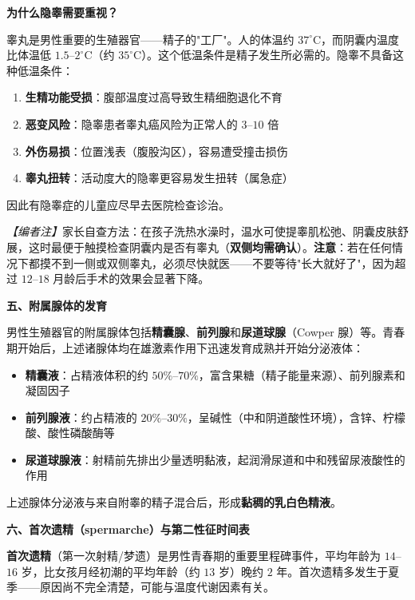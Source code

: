 \vspace{0.3em}
\noindent\textbf{为什么隐睾需要重视？}

睾丸是男性重要的生殖器官——精子的"工厂"。人的体温约 $37^\circ\text{C}$，而阴囊内温度比体温低 $1.5$--$2^\circ\text{C}$（约 $35^\circ\text{C}$）。这个低温条件是精子发生所必需的。隐睾不具备这种低温条件：
\begin{enumerate}
	\item \textbf{生精功能受损}：腹部温度过高导致生精细胞退化不育
	\item \textbf{恶变风险}：隐睾患者睾丸癌风险为正常人的 $3$--$10$ 倍
	\item \textbf{外伤易损}：位置浅表（腹股沟区），容易遭受撞击损伤
	\item \textbf{睾丸扭转}：活动度大的隐睾更容易发生扭转（属急症）
\end{enumerate}

因此有隐睾症的儿童应尽早去医院检查诊治。

\vspace{0.3em}
\noindent\textit{【编者注】}家长自查方法：在孩子洗热水澡时，温水可使提睾肌松弛、阴囊皮肤舒展，这时最便于触摸检查阴囊内是否有睾丸（\textbf{双侧均需确认}）。\textbf{注意}：若在任何情况下都摸不到一侧或双侧睾丸，必须尽快就医——不要等待"长大就好了"，因为超过 $12$--$18$ 月龄后手术的效果会显著下降。


\vspace{0.3em}
\noindent\textbf{五、附属腺体的发育}

男性生殖器官的附属腺体包括\textbf{精囊腺}、\textbf{前列腺}和\textbf{尿道球腺}（Cowper 腺）等。青春期开始后，上述诸腺体均在雄激素作用下迅速发育成熟并开始分泌液体：
\begin{itemize}
	\item \textbf{精囊液}：占精液体积的约 $50\%$--$70\%$，富含果糖（精子能量来源）、前列腺素和凝固因子
	\item \textbf{前列腺液}：约占精液的 $20\%$--$30\%$，呈碱性（中和阴道酸性环境），含锌、柠檬酸、酸性磷酸酶等
	\item \textbf{尿道球腺液}：射精前先排出少量透明黏液，起润滑尿道和中和残留尿液酸性的作用
\end{itemize}

上述腺体分泌液与来自附睾的精子混合后，形成\textbf{黏稠的乳白色精液}。

\vspace{0.3em}
\noindent\textbf{六、首次遗精（spermarche）与第二性征时间表}

\textbf{首次遗精}（第一次射精/梦遗）是男性青春期的重要里程碑事件，平均年龄为 $14$--$16$ 岁，比女孩月经初潮的平均年龄（约 $13$ 岁）晚约 $2$ 年。首次遗精多发生于夏季——原因尚不完全清楚，可能与温度代谢因素有关。

